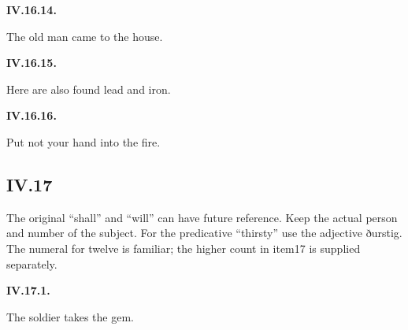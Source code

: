\par\begin{minipage}{\linewidth}\raggedright
\textbf{IV.16.14.}

The old man came to the house.

\end{minipage}\par\addvspace{4pt}

\par\begin{minipage}{\linewidth}\raggedright
\textbf{IV.16.15.}

Here are also found lead and iron.

\end{minipage}\par\addvspace{4pt}

\par\begin{minipage}{\linewidth}\raggedright
\textbf{IV.16.16.}

Put not your hand into the fire.

\end{minipage}\par\addvspace{4pt}

\subsection*{IV.17}

The original “shall” and “will” can have future reference. Keep the actual person and number of the subject. For the predicative “thirsty” use the adjective ðurstig. The numeral for twelve is familiar; the higher count in item17 is supplied separately.

\par\begin{minipage}{\linewidth}\raggedright
\textbf{IV.17.1.}

The soldier takes the gem.

\end{minipage}\par\addvspace{4pt}

